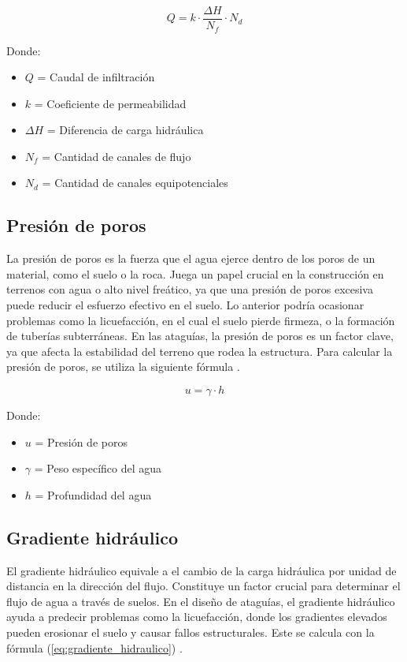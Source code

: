 \begin{equation}
    Q = k \cdot \frac{\Delta H}{N_{f}} \cdot N_{d}
    \label{eq:caudal_infiltracion}
\end{equation}

Donde:
\begin{itemize}
    \item $Q$ = Caudal de infiltración
    \item $k$ = Coeficiente de permeabilidad
    \item $\Delta H$ = Diferencia de carga hidráulica
    \item $N_{f}$ = Cantidad de canales de flujo
    \item $N_{d}$ = Cantidad de canales equipotenciales
\end{itemize}

\subsection{Presión de poros}
La presión de poros es la fuerza que el agua ejerce dentro de los poros de un material, como el suelo o la roca. Juega un papel crucial en la construcción en terrenos con agua o alto nivel freático, ya que una presión de poros excesiva puede reducir el esfuerzo efectivo en el suelo. Lo anterior podría ocasionar problemas como la licuefacción, en el cual el suelo pierde firmeza, o la formación de tuberías subterráneas. En las ataguías, la presión de poros es un factor clave, ya que afecta la estabilidad del terreno que rodea la estructura. Para calcular la presión de poros, se utiliza la siguiente fórmula \citep{jeas}.

\begin{equation}
    u = \gamma \cdot h
    \label{eq:presion_poros}
\end{equation}

Donde:
\begin{itemize}
    \item $u$ = Presión de poros
    \item $\gamma$ = Peso específico del agua
    \item $h$ = Profundidad del agua
\end{itemize}

\subsection{Gradiente hidráulico}
El gradiente hidráulico equivale a el cambio de la carga hidráulica por unidad de distancia en la dirección del flujo. Constituye un factor crucial para determinar el flujo de agua a través de suelos. En el diseño de ataguías, el gradiente hidráulico ayuda a predecir problemas como la licuefacción, donde los gradientes elevados pueden erosionar el suelo y causar fallos estructurales. Este se calcula con la fórmula (\ref{eq:gradiente_hidraulico}) \citep{budhu_soil_2010}.

